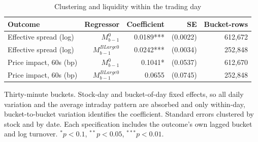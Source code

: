 \begin{table}[htbp]
\centering
\caption{Clustering and liquidity within the trading day}
\label{tab:intraday}
\small
\begin{threeparttable}
\begin{tabular}{@{}lrrrr@{}}
\toprule
Outcome & Regressor & Coefficient & SE & Bucket-rows \\
\midrule
Effective spread (log) & $M^{0}_{b-1}$ & 0.0189*** & (0.0022) & 612,672 \\
Effective spread (log) & $M^{BLarge0}_{b-1}$ & 0.0242*** & (0.0034) & 252,848 \\
Price impact, 60s (bp) & $M^{0}_{b-1}$ & 0.1041* & (0.0537) & 612,670 \\
Price impact, 60s (bp) & $M^{BLarge0}_{b-1}$ & 0.0655 & (0.0745) & 252,848 \\
\bottomrule
\end{tabular}
\begin{tablenotes}[flushleft]\footnotesize
\item Thirty-minute buckets. Stock-day and bucket-of-day fixed effects, so all daily variation and the average intraday pattern are absorbed and only within-day, bucket-to-bucket variation identifies the coefficient. Standard errors clustered by stock and by date. Each specification includes the outcome's own lagged bucket and log turnover. $^{*}p<0.1$, $^{**}p<0.05$, $^{***}p<0.01$.
\end{tablenotes}
\end{threeparttable}
\end{table}
